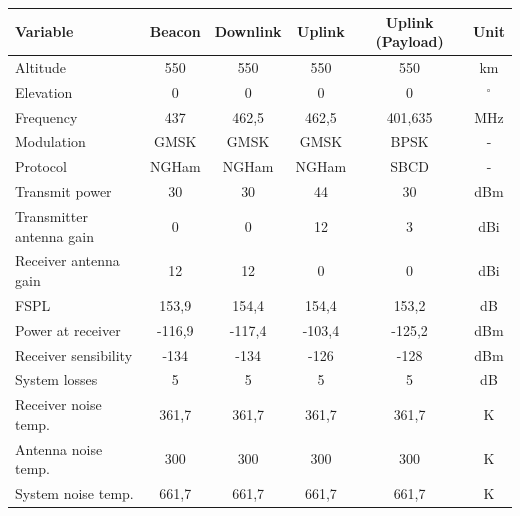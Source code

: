 \begin{table}[!h]
    \centering
    \begin{tabular}{L{0.3\textwidth}ccccc}
        \toprule[1.5pt]
        \textbf{Variable} & \textbf{Beacon} & \textbf{Downlink} & \textbf{Uplink} & \textbf{Uplink (Payload)} & \textbf{Unit}\\
        \midrule
        Altitude                        & 550           & 550           & 550           & 550           & km \\
        Elevation                       & 0             & 0             & 0             & 0             & $^{\circ}$ \\
        Frequency                       & 437           & 462,5         & 462,5         & 401,635       & MHz \\
        Modulation                      & GMSK          & GMSK          & GMSK          & BPSK          & - \\
        Protocol                        & NGHam         & NGHam         & NGHam         & SBCD          & - \\
        Transmit power                  & 30            & 30            & 44            & 30            & dBm \\
        Transmitter antenna gain        & 0             & 0             & 12            & 3             & dBi \\
        Receiver antenna gain           & 12            & 12            & 0             & 0             & dBi \\
        FSPL                            & 153,9         & 154,4         & 154,4         & 153,2         & dB \\
        Power at receiver               & -116,9        & -117,4        & -103,4        & -125,2        & dBm \\
        Receiver sensibility            & -134          & -134          & -126          & -128          & dBm \\
        System losses                   & 5             & 5             & 5             & 5             & dB \\
        Receiver noise temp.            & 361,7         & 361,7         & 361,7         & 361,7         & K \\
        Antenna noise temp.             & 300           & 300           & 300           & 300           & K \\
        System noise temp.              & 661,7         & 661,7         & 661,7         & 661,7         & K \\

\end{tabular}
\end{table}
